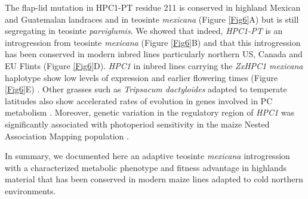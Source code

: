 \documentclass[9pt,twocolumn,twoside,lineno]{BioRxiv}
\begin{document}
The flap-lid mutation in HPC1-PT residue 211 is conserved in highland Mexican and Guatemalan landraces and in teosinte \textit{mexicana} (Figure \ref{Fig6}A) but is still segregating in teosinte \textit{parviglumis}. 
We showed that indeed, \textit{HPC1-PT} is an introgression from teosinte \textit{mexicana} (Figure \ref{Fig6}B) and that this introgression has been conserved in modern inbred lines particularly northern US, Canada and EU Flints (Figure \ref{Fig6}D). 
\textit{HPC1} in inbred lines carrying the \textit{ZxHPC1} \textit{mexicana} haplotype show low levels of expression and earlier flowering times (Figure \ref{Fig6}E) \cite{Kremling2018-gn}. 
Other grasses such as \textit{Tripsacum dactyloides} adapted to temperate latitudes also show accelerated rates of evolution in genes involved in PC metabolism \cite{Yan2019-tx}.
Moreover, genetic variation in the regulatory region of \textit{HPC1} was significantly associated with photoperiod sensitivity in the maize Nested Association Mapping population \cite{Hung2012-ms}. 

In summary, we documented here an adaptive teosinte \textit{mexicana} introgression with a characterized metabolic phenotype and fitness advantage in highlands material that has been conserved in modern maize lines adapted to cold northern environments. 

\end{document}
